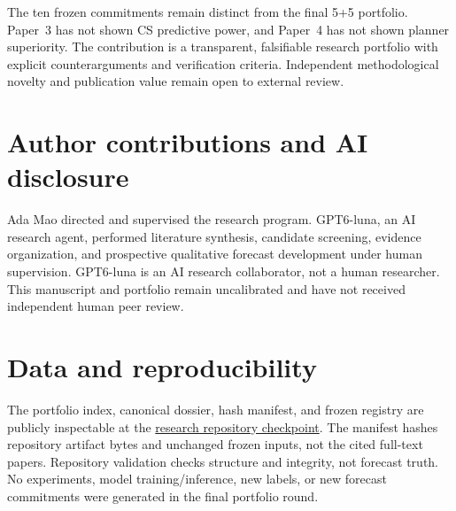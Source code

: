 \documentclass[11pt]{article}
\begin{document}
The ten frozen commitments remain distinct from the final 5+5 portfolio. Paper~3 has not shown CS predictive power, and Paper~4 has not shown planner superiority. The contribution is a transparent, falsifiable research portfolio with explicit counterarguments and verification criteria. Independent methodological novelty and publication value remain open to external review.

\section*{Author contributions and AI disclosure}
Ada Mao directed and supervised the research program. GPT6-luna, an AI research agent, performed literature synthesis, candidate screening, evidence organization, and prospective qualitative forecast development under human supervision. GPT6-luna is an AI research collaborator, not a human researcher. This manuscript and portfolio remain uncalibrated and have not received independent human peer review.

\section*{Data and reproducibility}
The portfolio index, canonical dossier, hash manifest, and frozen registry are publicly inspectable at the \href{https://github.com/nonameisready/scientific-discovery-computer-science/tree/db6aaa4b7f5fa364ced3042bf55d8df6b8eef1ce}{research repository checkpoint}. The manifest hashes repository artifact bytes and unchanged frozen inputs, not the cited full-text papers. Repository validation checks structure and integrity, not forecast truth. No experiments, model training/inference, new labels, or new forecast commitments were generated in the final portfolio round.
\end{document}
